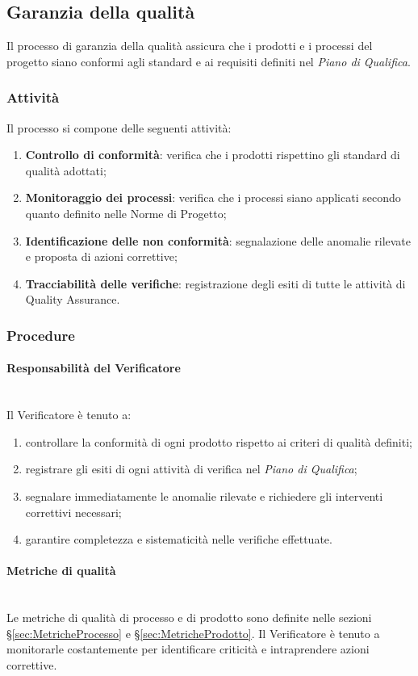 \documentclass[10pt, letterpaper]{article}
\newcommand{\trisubsection}[1]{\paragraph{#1}\mbox{}\\}
\begin{document}
\subsection{Garanzia della qualità}
Il processo di garanzia della qualità assicura che i prodotti e i processi del progetto siano conformi agli standard e ai requisiti definiti nel \textit{Piano di Qualifica}.

\subsubsection{Attività}
Il processo si compone delle seguenti attività:
\begin{enumerate}
    \item \textbf{Controllo di conformità}: verifica che i prodotti rispettino gli standard di qualità adottati;
    \item \textbf{Monitoraggio dei processi}: verifica che i processi siano applicati secondo quanto definito nelle Norme di Progetto;
    \item \textbf{Identificazione delle non conformità}: segnalazione delle anomalie rilevate e proposta di azioni correttive;
    \item \textbf{Tracciabilità delle verifiche}: registrazione degli esiti di tutte le attività di Quality Assurance.
\end{enumerate}

\subsubsection{Procedure}

\trisubsection{Responsabilità del Verificatore}
Il Verificatore è tenuto a:
\begin{enumerate}
    \item controllare la conformità di ogni prodotto rispetto ai criteri di qualità definiti;
    \item registrare gli esiti di ogni attività di verifica nel \textit{Piano di Qualifica};
    \item segnalare immediatamente le anomalie rilevate e richiedere gli interventi correttivi necessari;
    \item garantire completezza e sistematicità nelle verifiche effettuate.
\end{enumerate}

\trisubsection{Metriche di qualità}
\label{sec:MetricheQualita}
Le metriche di qualità di processo e di prodotto sono definite nelle sezioni §\ref{sec:MetricheProcesso} e §\ref{sec:MetricheProdotto}. Il Verificatore è tenuto a monitorarle costantemente per identificare criticità e intraprendere azioni correttive.
\end{document}
